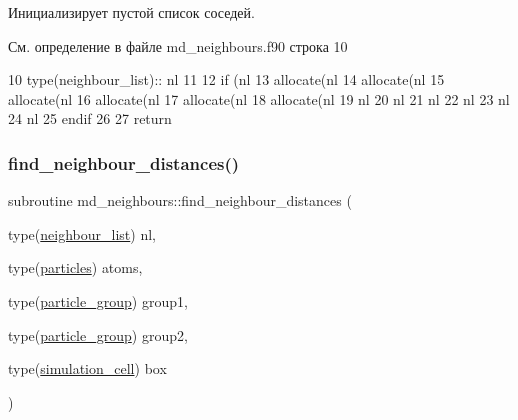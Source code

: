Инициализирует пустой список соседей. 



См. определение в файле md\+\_\+neighbours.\+f90 строка 10


\begin{DoxyCode}
10     \textcolor{keywordtype}{type}(neighbour\_list):: nl
11 
12     \textcolor{keywordflow}{if} (nl%
13         \textcolor{keyword}{allocate}(nl%
14         \textcolor{keyword}{allocate}(nl%
15         \textcolor{keyword}{allocate}(nl%
16         \textcolor{keyword}{allocate}(nl%
17         \textcolor{keyword}{allocate}(nl%
18         \textcolor{keyword}{allocate}(nl%
19         nl%
20         nl%
21         nl%
22         nl%
23         nl%
24         nl%
25 \textcolor{keywordflow}{    endif}
26     
27     \textcolor{keywordflow}{return}
\end{DoxyCode}
\mbox{\label{namespacemd__neighbours_ad313293c81b7fa1b52e8376710c84c0f}} 
\subsubsection{\texorpdfstring{find\+\_\+neighbour\+\_\+distances()}{find\_neighbour\_distances()}}
{\footnotesize\ttfamily subroutine md\+\_\+neighbours\+::find\+\_\+neighbour\+\_\+distances (\begin{DoxyParamCaption}\item[{type(\mbox{\hyperlink{structmd__general_1_1neighbour__list}{neighbour\+\_\+list}})}]{nl,  }\item[{type(\mbox{\hyperlink{structmd__general_1_1particles}{particles}})}]{atoms,  }\item[{type(\mbox{\hyperlink{structmd__general_1_1particle__group}{particle\+\_\+group}})}]{group1,  }\item[{type(\mbox{\hyperlink{structmd__general_1_1particle__group}{particle\+\_\+group}})}]{group2,  }\item[{type(\mbox{\hyperlink{structmd__general_1_1simulation__cell}{simulation\+\_\+cell}})}]{box }\end{DoxyParamCaption})}



